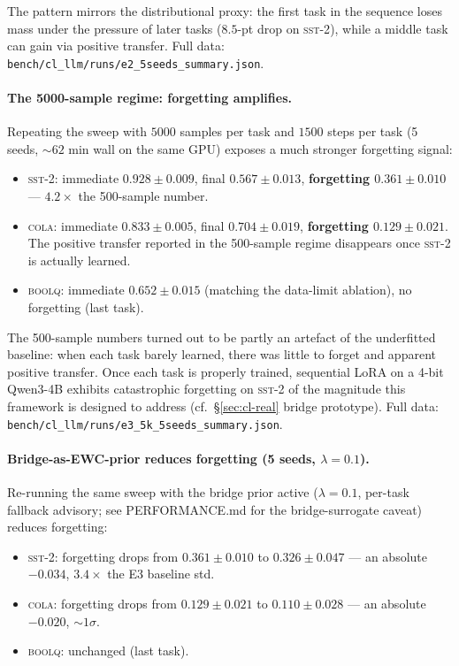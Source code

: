 \documentclass[11pt]{article}
\begin{document}
The pattern mirrors the distributional proxy: the first task in the
sequence loses mass under the pressure of later tasks
($8.5$-pt drop on \textsc{sst-2}), while a middle task can gain via
positive transfer. Full data:
\texttt{bench/cl\_llm/runs/e2\_5seeds\_summary.json}.

\paragraph{The 5000-sample regime: forgetting amplifies.}
Repeating the sweep with $5000$ samples per task and $1500$ steps
per task (5 seeds, $\sim 62$ min wall on the same GPU) exposes a
much stronger forgetting signal:

\begin{itemize}
  \item \textsc{sst-2}: immediate $0.928 \pm 0.009$, final
    $0.567 \pm 0.013$, \textbf{forgetting $0.361 \pm 0.010$}
    --- \emph{$4.2\times$} the 500-sample number.
  \item \textsc{cola}: immediate $0.833 \pm 0.005$, final
    $0.704 \pm 0.019$, \textbf{forgetting $0.129 \pm 0.021$}.
    The positive transfer reported in the 500-sample regime
    disappears once \textsc{sst-2} is actually learned.
  \item \textsc{boolq}: immediate $0.652 \pm 0.015$ (matching
    the data-limit ablation), no forgetting (last task).
\end{itemize}

The 500-sample numbers turned out to be partly an artefact of the
underfitted baseline: when each task barely learned, there was
little to forget and apparent positive transfer. Once each task is
properly trained, sequential LoRA on a 4-bit Qwen3-4B exhibits
catastrophic forgetting on \textsc{sst-2} of the magnitude this
framework is designed to address (cf.\ §\ref{sec:cl-real} bridge
prototype). Full data:
\texttt{bench/cl\_llm/runs/e3\_5k\_5seeds\_summary.json}.

\paragraph{Bridge-as-EWC-prior reduces forgetting (5 seeds, $\lambda{=}0.1$).}
Re-running the same sweep with the bridge prior active
($\lambda{=}0.1$, per-task fallback advisory; see
PERFORMANCE.md for the bridge-surrogate caveat) reduces forgetting:

\begin{itemize}
  \item \textsc{sst-2}: forgetting drops from $0.361 \pm 0.010$ to
    $\mathbf{0.326 \pm 0.047}$ — an absolute $-0.034$, $3.4\times$
    the E3 baseline std.
  \item \textsc{cola}: forgetting drops from $0.129 \pm 0.021$ to
    $\mathbf{0.110 \pm 0.028}$ — an absolute $-0.020$, $\sim 1\sigma$.
  \item \textsc{boolq}: unchanged (last task).
\end{itemize}
\end{document}
